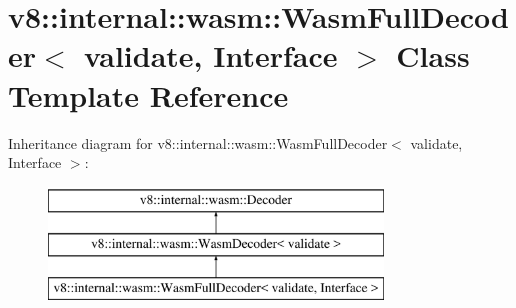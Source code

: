 \hypertarget{classv8_1_1internal_1_1wasm_1_1WasmFullDecoder}{}\section{v8\+:\+:internal\+:\+:wasm\+:\+:Wasm\+Full\+Decoder$<$ validate, Interface $>$ Class Template Reference}
\label{classv8_1_1internal_1_1wasm_1_1WasmFullDecoder}
Inheritance diagram for v8\+:\+:internal\+:\+:wasm\+:\+:Wasm\+Full\+Decoder$<$ validate, Interface $>$\+:\begin{figure}[H]
\begin{center}
\leavevmode
\includegraphics[height=3.000000cm]{classv8_1_1internal_1_1wasm_1_1WasmFullDecoder}
\end{center}
\end{figure}
